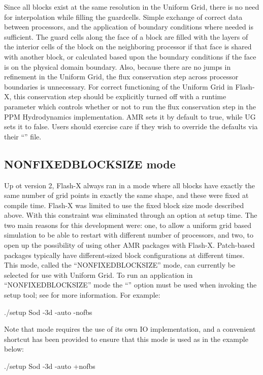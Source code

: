 Since all blocks exist at the same resolution in the Uniform Grid, 
there is no need for interpolation%
while
filling the guardcells. Simple exchange of correct data between
processors, and the application of boundary conditions where needed is
sufficient. The guard cells along the face of a block are filled with
the layers of the interior cells of the block on the neighboring
processor if that face is shared with another block, or calculated
based upon the boundary conditions if the face is on the physical
domain boundary. Also, because there are no jumps in refinement in the
Uniform Grid, the flux conservation step across processor boundaries
is unnecessary. For correct functioning of the Uniform Grid in Flash-X, 
this conservation step should be explicitly turned off with  a runtime
parameter  which controls whether or not to run
the flux conservation step in the PPM Hydrodynamics
implementation. AMR sets it by default to true, while UG sets
it to false. Users should exercise care if they wish to override the 
defaults via their ``'' file. 

\subsection{NONFIXEDBLOCKSIZE  mode}\label{Sec:NONFIXEDBLOCKSIZE}%
Up ot version 2, Flash-X always ran in a mode where all blocks have
exactly the same number of grid points in exactly the same shape, and these
were fixed at compile time. Flash-X was limited to use the fixed block
size mode described above. With \flashx this constraint was eliminated
through an option at setup time. The two main reasons for this
development were: one, to allow a uniform grid based simulation to be
able to restart with different number of processors, and two, to open up
the possibility of using other AMR packages with
Flash-X. Patch-based packages typically have different-sized
block configurations at different times. This mode,
called the ``NONFIXEDBLOCKSIZE'' mode, can currently be selected for
use with Uniform Grid. To run an
application in ``NONFIXEDBLOCKSIZE'' mode%
the ``'' option must be used when invoking the setup
tool; see  for more information.
For example:
\begin{codeseg}
./setup Sod -3d -auto -nofbs
\end{codeseg}
Note that  mode requires the use of its own IO implementation, 
and a convenient shortcut has been provided to ensure that this mode is used as 
in the example below:
\begin{codeseg}
./setup Sod -3d -auto +nofbs
\end{codeseg}

